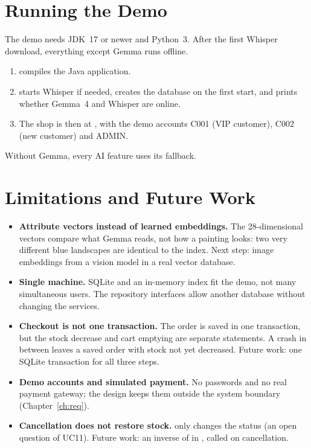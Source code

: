 
\section{Running the Demo}\label{sec:5.11}

The demo needs JDK~17 or newer and Python~3. After the first Whisper download, everything except Gemma runs offline.
\begin{enumerate}
\item {} compiles the Java application.
\item {} starts Whisper if needed, creates the database on the first start, and prints whether Gemma~4
      and Whisper are online.
\item The shop is then at , with the demo accounts C001 (VIP customer), C002
      (new customer) and ADMIN.
\end{enumerate}
Without Gemma, every AI feature uses its fallback.

\section{Limitations and Future Work}\label{sec:5.12}

\begin{itemize}
\item \textbf{Attribute vectors instead of learned embeddings.} The 28-dimensional vectors compare what Gemma reads,
      not how a painting looks: two very different blue landscapes are identical to the index. Next step: image
      embeddings from a vision model in a real vector database.
\item \textbf{Single machine.} SQLite and an in-memory index fit the demo, not many simultaneous users. The
      repository interfaces allow another database without changing the services.
\item \textbf{Checkout is not one transaction.} The order is saved in one transaction, but the stock decrease and
      cart emptying are separate statements. A crash in between leaves a saved order with stock not yet decreased.
      Future work: one SQLite transaction for all three steps.
\item \textbf{Demo accounts and simulated payment.} No passwords and no real payment gateway; the design keeps them
      outside the system boundary (Chapter~\ref{ch:req}).
\item \textbf{Cancellation does not restore stock.}  only changes the status (an open
      question of UC11). Future work: an inverse of  in , called on
      cancellation.
\end{itemize}

